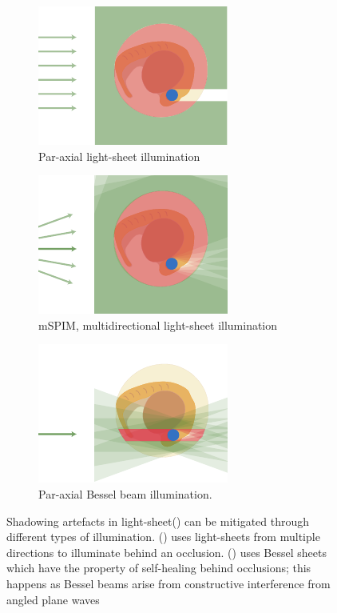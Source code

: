 \begin{figure}
	\centering
    \begin{subfigure}[t]{0.25\textwidth}
        \centering
        \includegraphics{exotic_beams_cartoon_para}
        \caption{Par-axial \gls{light-sheet} illumination}
        \label{fig:exotic_beams_cartoon_para}
    \end{subfigure}
    \hfill
    \begin{subfigure}[t]{0.25\textwidth}
        \centering
        \includegraphics{exotic_beams_cartoon_mspim}
        \caption{\gls{mSPIM}, multidirectional \gls{light-sheet} illumination}
        \label{fig:exotic_beams_cartoon_mspim}
    \end{subfigure}
    \hfill
    \begin{subfigure}[t]{0.25\textwidth}
        \centering
        \includegraphics{exotic_beams_cartoon_exotic}
        \caption{Par-axial Bessel beam illumination.}
        \label{fig:exotic_beams_cartoon_exotic}
    \end{subfigure}
    \caption{Shadowing artefacts in light-sheet() can be mitigated through different types of illumination.
    () uses \gls{light-sheet}s from multiple directions to illuminate behind an occlusion.
    () uses Bessel sheets which have the property of self-healing behind occlusions; this happens as Bessel beams arise from constructive interference from angled plane waves%
    }
    \label{fig:scatteringandshadowing}
\end{figure}

